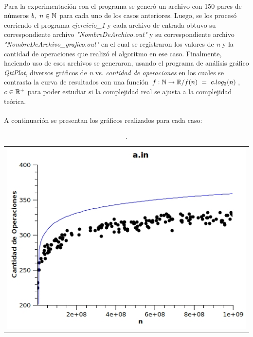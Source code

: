 \paragraph{}
Para la experimentación con el programa se generó un archivo con 150 pares de números $b,\ n \in \mathbb{N}$ para cada uno de los casos anteriores. Luego, se los procesó corriendo el programa \textit{ejercicio\_1} y cada archivo de entrada obtuvo su correspondiente archivo \textit{"NombreDeArchivo.out"} y su correspondiente archivo \textit{"NombreDeArchivo\_grafico.out"} en el cual se registraron los valores de \textit{n} y la cantidad de operaciones que realizó el algoritmo en ese caso. Finalmente, haciendo uso de esos archivos se generaron, usando el programa de análisis gráfico \textit{QtiPlot}, diversos gráficos de \textit{n} vs. \textit{cantidad de operaciones} en los cuales se contrasta la curva de resultados con una función $f: \mathbb{N} \rightarrow \mathbb{R} / f(n)\ =\ c.log_2(n)$, $c \in \mathbb{R}^+$ para poder estudiar si la complejidad real se ajusta a la complejidad teórica.\\

\paragraph{}
A continuación se presentan los gráficos realizados para cada caso:
	\begin{table}[ht]
		\centering 
			\begin{tabular}{c}
				\includegraphics[scale = 0.8]{./../ej1/tests/a.jpg}
			\end{tabular}
			\caption{.} 
	\end{table}

